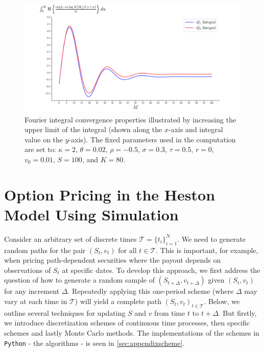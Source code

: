 \documentclass[11pt]{article}
\numberwithin{equation}{section}
\begin{document}
\begin{figure}[h!]
    \centering
    \includegraphics[width=\textwidth]{Qj-integrals.png}
    \caption{Fourier integral convergence properties illustrated by
    increasing the upper limit of the integral (shown along the $x$-axis and
    integral value on the $y$-axis). The fixed
    parameters used in the computation are set to: $\kappa = 2$, $\theta = 0.02$,
    $\rho = -0.5$, $\sigma = 0.3$, $\tau = 0.5$, $r = 0$, $v_0 = 0.01$, $S =
    100$, and $K = 80$.
    }
    \label{fig:qj-integrals}
\end{figure}

\newpage
\section{Option Pricing in the Heston Model Using Simulation}
Consider an arbitrary set of discrete times $\mathscr{T} = \{t_i\}_{i=1}^N$. We
need to generate random paths for the pair $(S_t, v_t)$ for all $t \in
\mathscr{T}$. This is important, for example, when pricing path-dependent
securities where the payout depends on observations of $S_t$ at specific dates.
To develop this approach, we first address the question of how to generate a
random sample of $(S_{t+\Delta}, v_{t+\Delta})$ given $(S_t, v_t)$ for any increment
$\Delta$. Repeatedly applying this one-period scheme (where $\Delta$ may vary at each
time in $\mathscr{T}$) will yield a complete path $(S_t, v_t)_{t \in
\mathscr{T}}$. Below, we outline several techniques for updating $S$ and $v$
from time $t$ to $t + \Delta$. But firstly, we introduce discretization
schemes of continuous time processes, then specific schemes and lastly Monte
Carlo methods. The implementations of the schemes in \texttt{Python} - the algorithms -
is seen in \autoref{sec:appendixscheme}.
\end{document}
